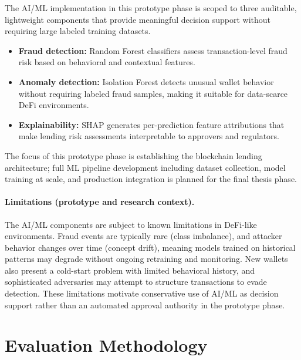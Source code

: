 \documentclass[12pt,a4paper]{report}
\begin{document}
The AI/ML implementation in this prototype phase is scoped to three auditable, lightweight components that provide meaningful decision support without requiring large labeled training datasets.

\begin{itemize}[noitemsep]
\item \textbf{Fraud detection:} Random Forest classifiers assess transaction-level fraud risk based on behavioral and contextual features.
\item \textbf{Anomaly detection:} Isolation Forest detects unusual wallet behavior without requiring labeled fraud samples, making it suitable for data-scarce DeFi environments.
\item \textbf{Explainability:} SHAP generates per-prediction feature attributions that make lending risk assessments interpretable to approvers and regulators.
\end{itemize}

The focus of this prototype phase is establishing the blockchain lending architecture; full ML pipeline development including dataset collection, model training at scale, and production integration is planned for the final thesis phase.

\paragraph{Limitations (prototype and research context).}
The AI/ML components are subject to known limitations in DeFi-like environments. Fraud events are typically rare (class imbalance), and attacker behavior changes over time (concept drift), meaning models trained on historical patterns may degrade without ongoing retraining and monitoring. New wallets also present a cold-start problem with limited behavioral history, and sophisticated adversaries may attempt to structure transactions to evade detection. These limitations motivate conservative use of AI/ML as decision support rather than an automated approval authority in the prototype phase.

\section{Evaluation Methodology}
\end{document}
